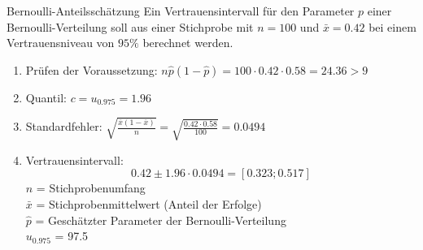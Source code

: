 \begin{example}{Bernoulli-Anteilsschätzung}
Ein Vertrauensintervall für den Parameter $p$ einer Bernoulli-Verteilung soll aus einer Stichprobe mit $n=100$ und $\bar{x}=0.42$ bei einem Vertrauensniveau von $95\%$ berechnet werden.

\begin{enumerate}
  \item Prüfen der Voraussetzung: $n\hat{p}(1-\hat{p})=100 \cdot 0.42 \cdot 0.58 = 24.36 > 9$
  \item Quantil: $c=u_{0.975}=1.96$
  \item Standardfehler: $\sqrt{\frac{\bar{x}(1-\bar{x})}{n}}=\sqrt{\frac{0.42 \cdot 0.58}{100}}=0.0494$
  \item Vertrauensintervall:
  $$
  0.42 \pm 1.96 \cdot 0.0494 = [0.323; 0.517]
  $$
$n$ = Stichprobenumfang\\
$\bar{x}$ = Stichprobenmittelwert (Anteil der Erfolge)\\
$\hat{p}$ = Geschätzter Parameter der Bernoulli-Verteilung\\
$u_{0.975}$ = 97.5%
\end{enumerate}
\end{example}
